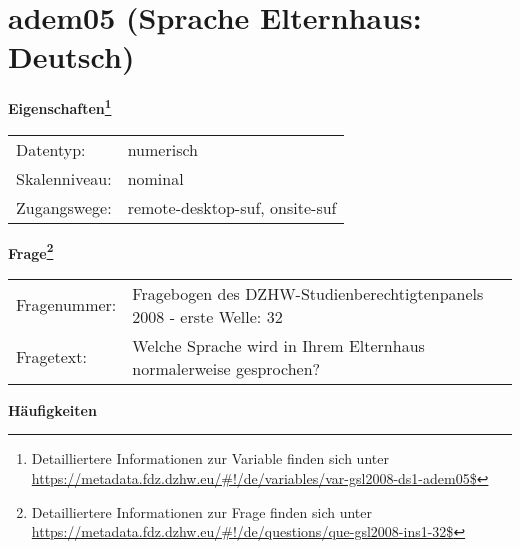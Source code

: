 
    \setcounter{footnote}{0}

    \vspace*{-1.8cm}
	\section{adem05 (Sprache Elternhaus: Deutsch)}
	\label{section:adem05}



    \vspace*{0.5cm}
    \noindent\textbf{Eigenschaften\footnote{Detailliertere Informationen zur Variable finden sich unter
		\url{https://metadata.fdz.dzhw.eu/\#!/de/variables/var-gsl2008-ds1-adem05$}}}\\
	\begin{tabularx}{\hsize}{@{}lX}
	Datentyp: & numerisch \\
	Skalenniveau: & nominal \\
	Zugangswege: &
	  remote-desktop-suf, 
	  onsite-suf
 \\
    \end{tabularx}



				\vspace*{0.5cm}
                \noindent\textbf{Frage\footnote{Detailliertere Informationen zur Frage finden sich unter
		              \url{https://metadata.fdz.dzhw.eu/\#!/de/questions/que-gsl2008-ins1-32$}}}\\
				\begin{tabularx}{\hsize}{@{}lX}
					Fragenummer: &
					  Fragebogen des DZHW-Studienberechtigtenpanels 2008 - erste Welle:
					  32
 \\
					Fragetext: & Welche Sprache wird in Ihrem Elternhaus normalerweise gesprochen? \\
				\end{tabularx}





        		\vspace*{0.5cm}
                \noindent\textbf{Häufigkeiten}

